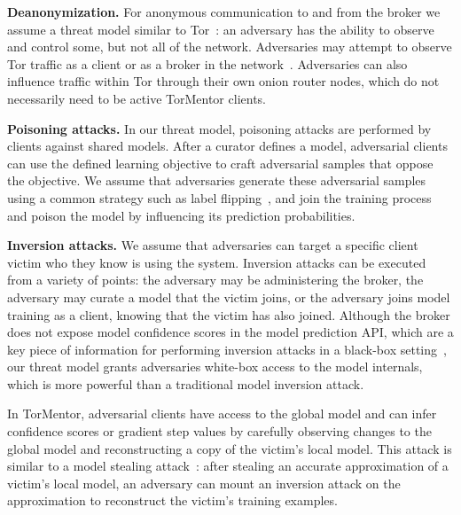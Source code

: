 
\textbf{Deanonymization.} For anonymous communication to and from the
broker we assume a threat model similar to Tor~\cite{Dingledine:2004}:
an adversary has the ability to observe and control some, but
not all of the network. Adversaries may attempt to observe Tor traffic
as a client or as a broker in the network~\cite{Murdoch:2005,
Evans:2009, Johnson:2013}. Adversaries can also influence traffic
within Tor through their own onion router nodes, which do not
necessarily need to be active TorMentor clients. 

\textbf{Poisoning attacks.} In our threat model, poisoning attacks are
performed by clients against shared models. After a curator defines a
model, adversarial clients can use the defined learning objective to
craft adversarial samples that oppose the objective. We assume that
adversaries generate these adversarial samples using a common strategy
such as label flipping~\cite{Biggio:2012}, and join the training
process and poison the model by influencing its prediction
probabilities.

\textbf{Inversion attacks.} We assume that adversaries can target a
specific client victim who they know is using the system. Inversion
attacks can be executed from a variety of points: the adversary may be
administering the broker, the adversary may curate a model that the
victim joins, or the adversary joins model training as a client,
knowing that the victim has also joined. Although the broker does not
expose model confidence scores in the model prediction API, which are a
key piece of information for performing inversion attacks in a
black-box setting~\cite{Fredrikson:2015}, our threat model grants
adversaries white-box access to the model internals, which is more
powerful than a traditional model inversion attack. 

In TorMentor, adversarial clients have access to the global model and
can infer confidence scores or gradient step values by carefully
observing changes to the global model and reconstructing a copy of the
victim's local model. This attack is similar to a model stealing
attack~\cite{Tramer:2016}: after stealing an accurate approximation of
a victim's local model, an adversary can mount an inversion attack on
the approximation to reconstruct the victim's training examples.

